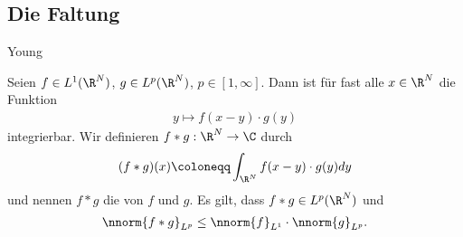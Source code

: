 \subsection{Die Faltung}
\begin{theorem} Young

Seien $f \in L^{1}(\R^{N})$, $g \in L^{p}(\R^{N})$, $p \in [1, \infty]$. Dann ist für fast alle $x \in \R^{N}$ die Funktion
\begin{align*}
  y \mapsto f(x - y)\cdot g(y)
\end{align*}
integrierbar. Wir definieren $f * g : \R^{N}\to \C$ durch
\begin{align*}
  (f * g)(x) \coloneqq \int_{\R^{N}} f(x - y)\cdot g(y) dy
\end{align*}
und nennen $f * g$ die  von $f$ und $g$. Es gilt, dass $f*g \in L^{p}(\R^{N})$ und
\begin{align*}
  \nnorm {f * g}_{L^{p}} \leq   \nnorm {f}_{L^{1}} \cdot   \nnorm {g}_{L^{p}}. 
\end{align*}
\end{theorem}
